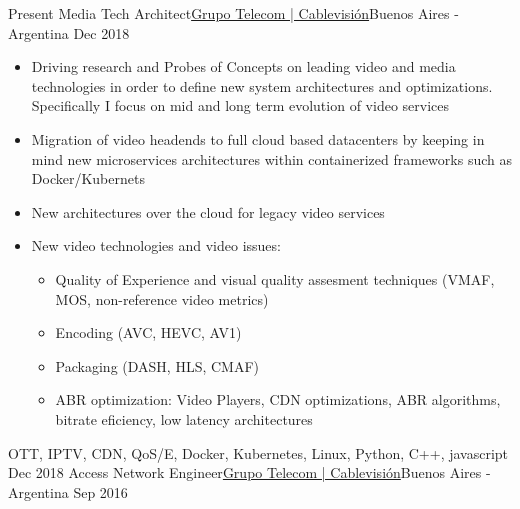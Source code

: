 %
%
%

\begin{experiences}
  \experience
    {Present}   {Media Tech Architect}{\href{https://www.cablevisionfibertel.com.ar/}{\color{accentcolor}Grupo Telecom | Cablevisión}}{Buenos Aires - Argentina}
    {Dec 2018} {
                      \begin{itemize}
                      \item Driving research and Probes of Concepts on leading video and media technologies in order to define new system architectures and optimizations. Specifically I focus on mid and long term evolution of video services
                      \item Migration of video headends to full cloud based datacenters by keeping in mind new microservices architectures within containerized frameworks such as Docker/Kubernets
                      \item New architectures over the cloud for legacy video services
                      \item New video technologies and video issues:
                        \begin{itemize}
                        \item Quality of Experience and visual quality assesment techniques (VMAF, MOS, non-reference video metrics)
                        \item Encoding (AVC, HEVC, AV1)
                        \item Packaging (DASH, HLS, CMAF) 
                        \item ABR optimization: Video Players, CDN optimizations, ABR algorithms, bitrate eficiency, low latency architectures
                        \end{itemize}
                      \end{itemize}
                    }
                    {OTT, IPTV, CDN, QoS/E, Docker, Kubernetes, Linux, Python, C++, javascript}
  \emptySeparator
  \experience
    {Dec 2018} {Access Network  Engineer}{\href{https://www.cablevisionfibertel.com.ar/}{\color{accentcolor}Grupo Telecom | Cablevisión}}{Buenos Aires - Argentina}
    {Sep 2016}    {
}
\end{experiences}
